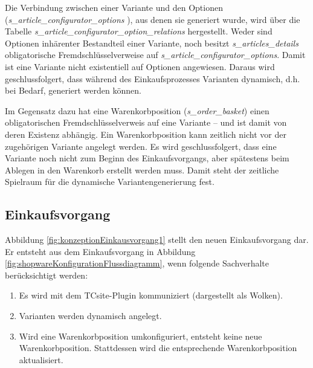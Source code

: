 \documentclass[11pt, a4paper, titlepage, listof=totoc, bibliography=totoc, index=totoc, twoside, openright, headings=normal]{scrreprt}
\begin{document}
Die Verbindung zwischen einer Variante und den Optionen (\emph{s\_article\_configurator\_options }), aus denen sie generiert wurde, wird über die Tabelle \emph{s\_article\_configurator\_option\_relations} hergestellt. Weder sind Optionen inhärenter Bestandteil einer Variante, noch besitzt \emph{s\_articles\_details} obligatorische Fremdschlüsselverweise auf \emph{s\_article\_configurator\_options}. Damit ist eine Variante nicht existentiell auf Optionen angewiesen. Daraus wird geschlussfolgert, dass während des Einkaufsprozesses Varianten dynamisch, d.h. bei Bedarf, generiert werden können.

Im Gegensatz dazu hat eine Warenkorbposition (\emph{s\_order\_basket}) einen obligatorischen Fremdschlüsselverweis auf eine Variante -- und ist damit von deren Existenz abhängig. Ein Warenkorbposition kann zeitlich nicht vor der zugehörigen Variante angelegt werden. Es wird geschlussfolgert, dass eine Variante noch nicht zum Beginn des Einkaufsvorgangs, aber spätestens beim Ablegen in den Warenkorb erstellt werden muss. Damit steht der zeitliche Spielraum für die dynamische Variantengenerierung fest.

\subsection{Einkaufsvorgang}
Abbildung \ref{fig:konzeptionEinkausvorgang1} stellt den neuen Einkaufsvorgang dar. Er entsteht aus dem Einkaufsvorgang in Abbildung \ref{fig:shopwareKonfigurationFlussdiagramm}, wenn folgende Sachverhalte berücksichtigt werden:
\begin{enumerate}
\item Es wird mit dem TCsite-Plugin kommuniziert (dargestellt als Wolken).
\item Varianten werden dynamisch angelegt.
\item Wird eine Warenkorbposition umkonfiguriert, entsteht keine neue Warenkorbposition. Stattdessen wird die entsprechende Warenkorbposition aktualisiert.
\end{enumerate}
\end{document}
